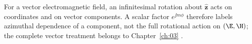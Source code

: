 
For a vector electromagnetic field, an infinitesimal rotation about $\hat{\mathbf{z}}$ acts on coordinates and on vector components. A scalar factor $e^{\jj m\phi}$ therefore labels azimuthal dependence of a component, not the full rotational action on $(\E,\H)$; the complete vector treatment belongs to Chapter~\ref{ch:03} \cite{hansen1988,stratton1941}.
